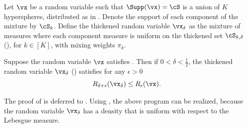 \documentclass[../../book-main.tex]{subfiles}
\begin{document}
\begin{definition}\label{def:thickening-rv-uos}
    Let $\vx$ be a random variable such that $\Supp(\vx) = \cS$ is a union of
    $K$ hyperspheres, distributed as in .
    Denote the support of each component of the mixture by $\cS_k$.
    Define the thickened random variable $\vx_{\delta}$ as the mixture of
    measures where each component measure is uniform on the thickened set
    $\cS_{k, \delta}$ (), for $k \in [K]$, with mixing
    weights $\pi_k$.
\end{definition}

\begin{lemma}\label{lem:rate-distortion-lb-uos}
    Suppose the random variable $\vx$ satisfies
    . Then if $0 < \delta < \tfrac{1}{2}$, the
    thickened random variable $\vx_{\delta}$ ()
    satisfies for any $\epsilon > 0$
    \begin{equation}
        R_{\delta + \epsilon}(\vx_{\delta})
        \leq
        R_{\epsilon}(\vx).
    \end{equation}
\end{lemma}

The proof of  is deferred to
.
Using , the above program can be realized,
because the random variable $\vx_{\delta}$ has a density that is uniform with
respect to the Lebesgue measure.
\end{document}
